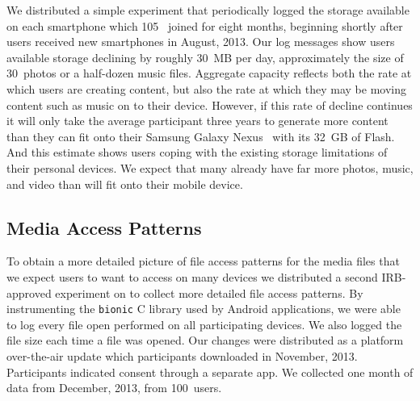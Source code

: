 We distributed a simple experiment that periodically logged the storage
available on each smartphone which 105~\PhoneLab{} joined for eight months,
beginning shortly after \PhoneLab{} users received new smartphones in August,
2013. Our log messages show users available storage declining by roughly
30~MB per day, approximately the size of 30~photos or a half-dozen music
files. Aggregate capacity reflects both the rate at which users are creating
content, but also the rate at which they may be moving content such as music
on to their device. However, if this rate of decline continues it will only
take the average \PhoneLab{} participant three years to generate more content
than they can fit onto their Samsung Galaxy Nexus~\cite{galaxynexus} with its
32~GB of Flash. And this estimate shows users coping with the existing
storage limitations of their personal devices. We expect that many already
have far more photos, music, and video than will fit onto their mobile
device.

\subsection{Media Access Patterns}

To obtain a more detailed picture of file access patterns for the media files
that we expect users to want to access on many devices we distributed a
second IRB-approved experiment on \PhoneLab{} to collect more detailed file
access patterns. By instrumenting the \texttt{bionic} C library used by
Android applications, we were able to log every file open performed on all
participating devices. We also logged the file size each time a file was
opened. Our changes were distributed as a platform over-the-air update which
\PhoneLab{} participants downloaded in November, 2013. Participants indicated
consent through a separate app. We collected one month of data from December,
2013, from 100~users.


